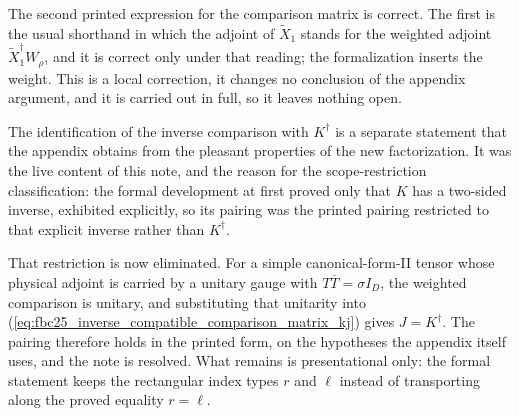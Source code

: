 \documentclass{article}
\begin{document}
The second printed expression for the comparison matrix is correct. The first
is the usual shorthand in which the adjoint of $\tilde X_1$ stands for the
weighted adjoint $\tilde X_1^\dagger W_\rho$, and it is correct only under that
reading; the formalization inserts the weight. This is a local correction, it
changes no conclusion of the appendix argument, and it is carried out in full,
so it leaves nothing open.

The identification of the inverse comparison with $K^\dagger$ is a separate
statement that the appendix obtains from the pleasant properties of the new
factorization. It was the live content of this note, and the reason for the
scope-restriction classification: the formal development at first proved only
that $K$ has a two-sided inverse, exhibited explicitly, so its pairing was the
printed pairing restricted to that explicit inverse rather than $K^\dagger$.

That restriction is now eliminated. For a simple canonical-form-II tensor whose
physical adjoint is carried by a unitary gauge with $T\overline T=\sigma I_D$,
the weighted comparison is unitary, and substituting that unitarity into
(\ref{eq:fbc25_inverse_compatible_comparison_matrix_kj}) gives
$J=K^\dagger$. The pairing therefore holds in the printed form, on the
hypotheses the appendix itself uses, and the note is resolved. What remains is
presentational only: the formal statement keeps the rectangular index types $r$
and $\ell$ instead of transporting along the proved equality $r=\ell$.



\end{document}
